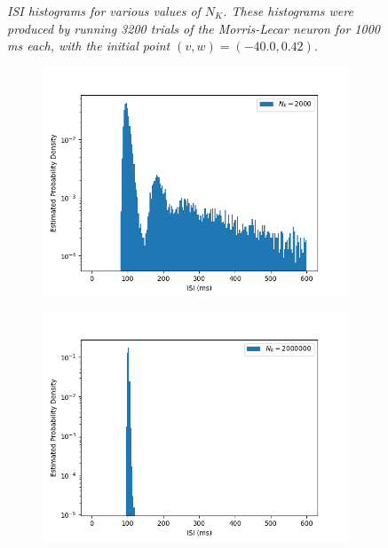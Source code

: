 \documentclass[letterpaper,12pt]{article}
\numberwithin{table}{section}
\numberwithin{figure}{section}
\numberwithin{equation}{section}
\newcommand{\ccaption}[1]{\caption{\textit{#1}}}
\begin{document}
\begin{flushleft}
\begin{figure}[!h]
        \ccaption{ISI histograms for various values of $N_K$. These histograms were produced by running 3200 trials of the Morris-Lecar neuron for 1000 ms each, with the initial point $(v, w) = (-40.0, 0.42)$.}

    \end{figure}
    \begin{figure}[!h]\ContinuedFloat

        \centering

        \begin{subfigure}{0.75\textwidth}
            \includegraphics[width=\linewidth]{img/isih-nk2000.jpg}
        \end{subfigure}
    
        \begin{subfigure}{0.75\textwidth}
            \includegraphics[width=\linewidth]{img/isih-nk2000000.jpg}
        \end{subfigure}


\end{figure}
\end{flushleft}
\end{document}
